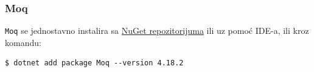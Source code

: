 \subsubsection{Moq}\label{moq}

\texttt{Moq} se jednostavno instalira sa \href{https://www.nuget.org/packages/Moq}{NuGet repozitorijuma} ili uz pomoć IDE-a, ili kroz komandu:

\begin{verbatim}
$ dotnet add package Moq --version 4.18.2
\end{verbatim}
